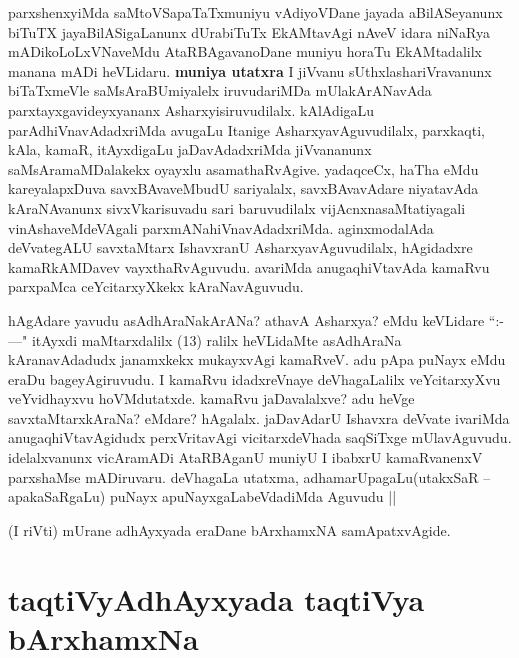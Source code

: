 \begin{artha}
parxshenxyiMda saMtoVSapaTaTxmuniyu vAdiyoVDane jayada aBilASeyanunx biTuTX jayaBilASigaLanunx dUrabiTuTx EkAMtavAgi nAveV idara niNaRya mADikoLoLxVNaveMdu AtaRBAgavanoDane muniyu horaTu EkAMtadalilx manana mADi heVLidaru.
\textbf{muniya utatxra} I jiVvanu sUthxlashariVravanunx biTaTxmeVle saMsAraBUmiyalelx iruvudariMDa mUlakArANavAda parxtayxgavideyxyananx Asharxyisiruvudilalx. kAlAdigaLu parAdhiVnavAdadxriMda avugaLu Itanige AsharxyavAguvudilalx, parxkaqti, kAla, kamaR, itAyxdigaLu jaDavAdadxriMda jiVvananunx saMsAramaMDalakekx oyayxlu asamathaRvAgive. yadaqceCx, haTha eMdu kareyalapxDuva savxBAvaveMbudU sariyalalx, savxBAvavAdare niyatavAda kAraNAvanunx sivxVkarisuvadu sari baruvudilalx vijAcnxnasaMtatiyagali vinAshaveMdeVAgali parxmANahiVnavAdadxriMda. aginxmodalAda deVvategALU savxtaMtarx IshavxranU AsharxyavAguvudilalx, hAgidadxre kamaRkAMDavev vayxthaRvAguvudu. avariMda anugaqhiVtavAda kamaRvu parxpaMca ceYcitarxyXkekx kAraNavAguvudu.

hAgAdare yavudu asAdhAraNakArANa? athavA Asharxya? eMdu keVLidare ``\stext:- ---" itAyxdi maMtarxdalilx (13) ralilx heVLidaMte asAdhAraNa kAranavAdadudx janamxkekx mukayxvAgi kamaRveV. adu pApa puNayx eMdu eraDu bageyAgiruvudu. I kamaRvu idadxreVnaye deVhagaLalilx veYcitarxyXvu veYvidhayxvu hoVMdutatxde. kamaRvu jaDavalalxve? adu heVge savxtaMtarxkAraNa? eMdare? hAgalalx. jaDavAdarU Ishavxra deVvate ivariMda anugaqhiVtavAgidudx  perxVritavAgi vicitarxdeVhada saqSiTxge mUlavAguvudu. idelalxvanunx  vicAramADi AtaRBAganU muniyU I ibabxrU kamaRvanenxV parxshaMse mADiruvaru. deVhagaLa utatxma, adhamarUpagaLu(utakxSaR --apakaSaRgaLu) puNayx apuNayxgaLabeVdadiMda Aguvudu ||
\end{artha}

\begin{center}
(I riVti) mUrane adhAyxyada eraDane bArxhamxNA samApatxvAgide.
\end{center}

\section*{taqtiVyAdhAyxyada taqtiVya bArxhamxNa}

\begin{center}
\end{center}

